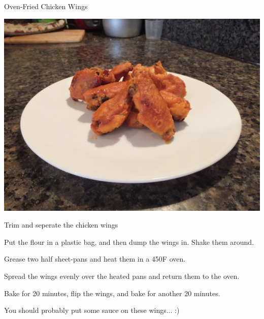 \documentclass{recipe}
\begin{document}
\begin{recipe}{Oven-Fried Chicken Wings}

  \begin{ingredients}
  \end{ingredients}

  \begin{images}
    \begin{image}
      \includegraphics[width=\linewidth,trim=150px 300px 150px 450px, clip=true]{oven_fried_wings-01.jpeg}
    \end{image}
  \end{images}

  \begin{steps}
  \item Trim and seperate the chicken wings
  \item Put the flour in a plastic bag, and then dump the wings in.
    Shake them around.
  \item Grease two half sheet-pans and heat them in a 450\degree F
    oven.
  \item Spread the wings evenly over the heated pans and return them
    to the oven.
  \item Bake for 20 minutes, flip the wings, and bake for another 20
    minutes.
  \end{steps}

  \begin{notes}
  \item You should probably put some sauce on these wings... :)
  \end{notes}
\end{recipe}
\end{document}
